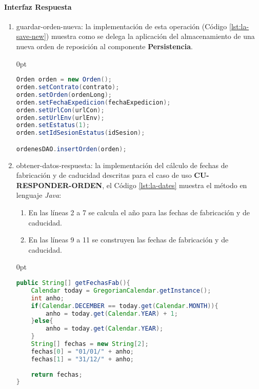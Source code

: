 \paragraph{\indent Interfaz Respuesta}
\begin{enumerate}
	\item guardar-orden-nueva: la implementación de esta operación (Código \ref{lst:la-save-new}) muestra como se delega la aplicación del almacenamiento de una nueva orden de reposición al componente \textbf{Persistencia}.
	\begin{adjustwidth}{\listingfixwidth}{0pt}
	\begin{lstlisting}[language=Java, caption={Delegación del almacenamiento de una nueva orden de reposición.}, captionpos=b, label={lst:la-save-new}]
Orden orden = new Orden();
orden.setContrato(contrato);
orden.setOrden(ordenLong);
orden.setFechaExpedicion(fechaExpedicion);
orden.setUrlCon(urlCon);
orden.setUrlEnv(urlEnv);
orden.setEstatus(1);
orden.setIdSesionEstatus(idSesion);

ordenesDAO.insertOrden(orden);
	\end{lstlisting}
	\end{adjustwidth}

	\item obtener-datos-respuesta: la implementación del cálculo de fechas de fabricación y de caducidad descritas para el caso de uso \textbf{CU-RESPONDER-ORDEN}, el Código \ref{lst:la-dates} muestra el método en lenguaje \textit{Java}:
	\begin{enumerate}
		\item En las líneas 2 a 7 se calcula el año para las fechas de fabricación y de caducidad.
		\item En las líneas 9 a 11 se construyen las fechas de fabricación y de caducidad.
	\end{enumerate}
	\begin{adjustwidth}{\listingfixwidth}{0pt}
	\begin{lstlisting}[language=Java, caption={Método para calcular las fechas de fabricación y caducidad.}, captionpos=b, label={lst:la-dates}]
public String[] getFechasFab(){
	Calendar today = GregorianCalendar.getInstance();
	int anho;
	if(Calendar.DECEMBER == today.get(Calendar.MONTH)){
		anho = today.get(Calendar.YEAR) + 1;
	}else{
		anho = today.get(Calendar.YEAR);
	}
	String[] fechas = new String[2];
	fechas[0] = "01/01/" + anho;
	fechas[1] = "31/12/" + anho;
	
	return fechas;
}
	\end{lstlisting}
	\end{adjustwidth}


\end{enumerate}
